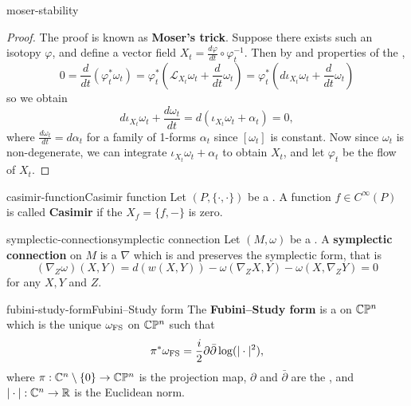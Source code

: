 \begin{example}{moser-stability}
    \begin{proof}
        The proof is known as \textbf{Moser's trick}. Suppose there exists such an isotopy $\varphi$, and define a vector field $X_t = \frac{d \varphi}{d t} \circ \varphi_t^{-1}$. Then by  and properties of the ,
        \[ 0 = \frac{d}{dt} \left(\varphi_t^* \omega_t\right) = \varphi_t^* \left(\mathcal{L}_{X_t} \omega_t + \frac{d}{dt} \omega_t \right) = \varphi_t^* \left(d \iota_{X_t} \omega_t + \frac{d}{dt} \omega_t \right) \]
        so we obtain
        \[ d \iota_{X_t} \omega_t + \frac{d \omega_t}{dt} = d(\iota_{X_t} \omega_t + \alpha_t) = 0 , \]
        where $\frac{d \omega_t}{d t} = d \alpha_t$ for a family of 1-forms $\alpha_t$ since $[\omega_t]$ is constant. Now since $\omega_t$ is non-degenerate, we can integrate $\iota_{X_t} \omega_t + \alpha_t$ to obtain $X_t$, and let $\varphi_t$ be the flow of $X_t$.
    \end{proof}
\end{example}

\begin{topic}{casimir-function}{Casimir function}
    Let $(P, \{ \cdot, \cdot \})$ be a . A function $f \in C^\infty(P)$ is called \textbf{Casimir} if the  $X_f = \{ f, - \}$ is zero.
\end{topic}

\begin{topic}{symplectic-connection}{symplectic connection}
    Let $(M, \omega)$ be a . A \textbf{symplectic connection} on $M$ is a  $\nabla$ which is  and preserves the symplectic form, that is
    \[ (\nabla_Z \omega)(X, Y) = d(w(X, Y)) - \omega(\nabla_Z X, Y) - \omega(X, \nabla_Z Y) = 0 \]
    for any  $X, Y$ and $Z$.
\end{topic}

\begin{topic}{fubini-study-form}{Fubini--Study form}
    The \textbf{Fubini--Study form} is a  on $\mathbb{C} \mathbb{P}^n$ which is the unique  $\omega_\textup{FS}$ on $\mathbb{C} \mathbb{P}^n$ such that
    \[ \pi^* \omega_\textup{FS} = \frac{i}{2} \partial \bar{\partial} \log (|\cdot|^2) , \]
    where $\pi : \mathbb{C}^n \setminus \{ 0 \} \to \mathbb{C} \mathbb{P}^n$ is the projection map, $\partial$ and $\bar{\partial}$ are the , and $|\cdot| : \mathbb{C}^n \to \mathbb{R}$ is the Euclidean norm.
\end{topic}

